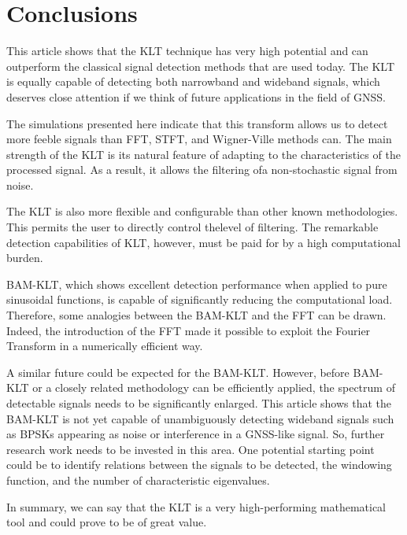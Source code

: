 \documentclass[12pt]{report}
\begin{document}
\section*{Conclusions}
This article shows that the KLT technique has very high potential and can outperform the classical signal detection methods that are used today. The KLT is equally capable of detecting both narrowband and wideband signals, which deserves close attention if
we think of future applications in the field of GNSS.

The simulations presented here indicate that this transform allows us to detect more feeble signals than FFT, STFT, and Wigner-Ville methods can. The main strength of the KLT is its natural feature of adapting to the characteristics of the processed signal. As a result, it allows the filtering ofa non-stochastic signal from noise.

The KLT is also more flexible and configurable than other known methodologies. This permits the user to directly control thelevel of filtering. The remarkable detection capabilities of KLT, however, must be paid for by a high computational burden.

BAM-KLT, which shows excellent detection performance when applied to pure sinusoidal functions, is capable of significantly reducing the computational load. Therefore, some analogies between the BAM-KLT and the FFT can be drawn. Indeed, the introduction of the FFT made it possible to exploit the Fourier Transform in a numerically efficient way.

A similar future could be expected for the BAM-KLT. However, before BAM-KLT or a closely related methodology can be efficiently applied, the spectrum of detectable signals needs to be significantly enlarged. This article shows that the BAM-KLT is not yet capable of unambiguously detecting wideband signals such as BPSKs appearing as noise or interference in a GNSS-like signal. So, further research work needs to be invested in this area. One potential starting point could be to identify relations between the signals to be detected, the windowing function, and the number of characteristic eigenvalues.

In summary, we can say that the KLT is a very high-performing mathematical tool and could prove to be of great value.
\end{document}
